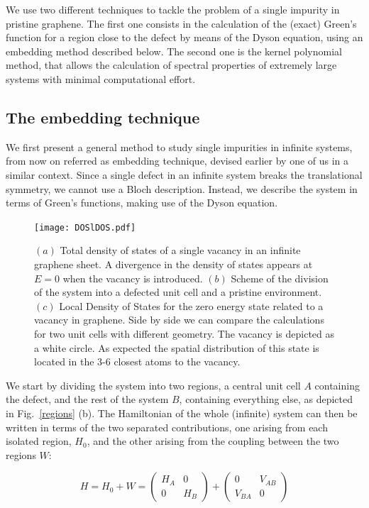 \documentclass[aps,prb,twocolumn,superscriptaddress]{revtex4-1}
\begin{document}
We use two different techniques to tackle the problem of a single impurity in
pristine graphene. The first one consists in the calculation of the (exact)
Green's function for a region close to the defect by means of the Dyson
equation, using an embedding method described below.
The second one is the kernel polynomial method, that allows the calculation of spectral properties of extremely large systems with minimal computational effort.


\subsection{The embedding technique}
We first present a general method to study single impurities in infinite systems, from now on referred as embedding technique, devised earlier by one of us in a similar context.\cite{Jacob2010orbital}
Since a single defect in an infinite system breaks the translational symmetry, we cannot use a Bloch description. Instead, we describe the system in terms of Green's functions, making use of the Dyson equation.
\begin{figure}[t!]
\centering\texttt{[image: DOSlDOS.pdf]}
\caption{$(a)$ Total density of states of a single vacancy in an infinite graphene sheet. A divergence in the density of states appears at $E=0$ when the vacancy is introduced. $(b)$ Scheme of the division of the system into a defected unit cell and a pristine environment. $(c)$ Local Density of States for the zero energy state related to a vacancy in graphene. Side by side we can compare the calculations for two unit cells with different geometry. The vacancy is depicted as a white circle. As expected the spatial distribution of this state is located in the 3-6 closest atoms to the vacancy.}
\label{regions}
\label{DOS}
\vspace{-5pt}
\end{figure}
We start by dividing the system into two regions, a central unit cell $A$ containing the defect, and the rest of the system $B$, containing everything else, as depicted in Fig.~\ref{regions} (b).
The Hamiltonian of the whole (infinite) system can then be written in terms of the two separated contributions, one arising from each isolated region, $H_0$, and the other arising from the coupling between the two regions $W$:

\begin{equation}
  H = H_{0} + W = \left(\begin{array}{cc}
   H_{A} &  0  \\
    0     & H_{B}
  \end{array}\right)+
  \left(\begin{array}{cc}
    0 & V_{AB} \\
   V_{BA} & 0
  \end{array}\right)
\end{equation}
\end{document}
